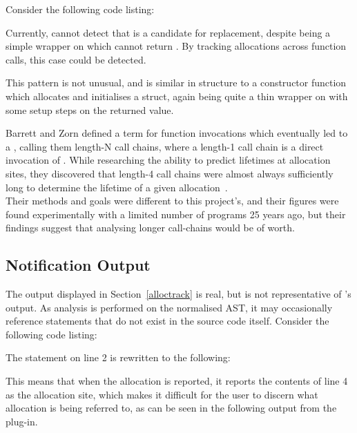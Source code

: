 Consider the following code listing:



Currently,  cannot detect that  is a candidate for replacement, despite  being a simple wrapper on \malloc{} which cannot return . By tracking allocations across function calls, this case could be detected.

This pattern is not unusual, and is similar in structure to a constructor function which allocates and initialises a struct, again being quite a thin wrapper on \malloc{} with some setup steps on the returned value.

Barrett and Zorn defined a term for function invocations which eventually led to a \malloc{}, calling them length-N call chains, where a length-1 call chain is a direct invocation of \malloc{}. While researching the ability to predict lifetimes at allocation sites, they discovered that length-4 call chains were almost always sufficiently long to determine the lifetime of a given allocation~\cite{predictors}. \\
Their methods and goals were different to this project's, and their figures were found experimentally with a limited number of programs 25 years ago, but their findings suggest that analysing longer call-chains would be of worth.

\subsection{Notification Output}

The output displayed in Section~\ref{alloctrack} is real, but is not representative of 's output. As analysis is performed on the normalised AST, it may occasionally reference statements that do not exist in the source code itself. Consider the following code listing:



The statement on line 2 is rewritten to the following:



This means that when the allocation is reported, it reports the contents of line 4 as the allocation site, which makes it difficult for the user to discern what allocation is being referred to, as can be seen in the following output from the plug-in.

